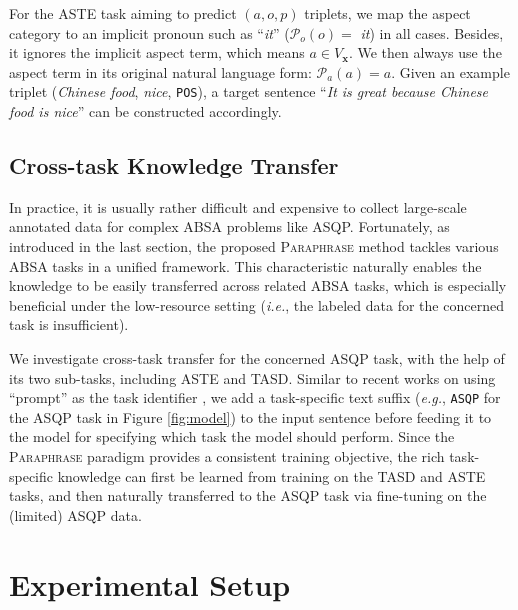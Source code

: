 \documentclass[11pt]{article}
\begin{document}
For the ASTE task aiming to predict $(a, o, p)$ triplets, we map the aspect category to an implicit pronoun such as ``\textit{it}'' ($\mathcal{P}_o(o)=$ \textit{it}) in all cases.
Besides, it ignores the implicit aspect term, which means $a \in V_{\boldsymbol{x}}$. We then always use the aspect term in its original natural language form: $\mathcal{P}_a(a) = a$. 
Given an example triplet (\textit{Chinese food}, \textit{nice}, \texttt{POS}), a target sentence ``\textit{It is great because Chinese food is nice}'' can be constructed accordingly.


\subsection{Cross-task Knowledge Transfer}
In practice, it is usually rather difficult and expensive to collect large-scale annotated data for complex ABSA problems like ASQP. Fortunately, as introduced in the last section, the proposed \textsc{Paraphrase} method tackles various ABSA tasks in a unified framework.
This characteristic naturally enables the knowledge to be easily transferred across related ABSA tasks, which is especially beneficial under the low-resource setting (\textit{i.e.}, the labeled data for the concerned task is insufficient).


We investigate cross-task transfer for the concerned ASQP task, with the help of its two sub-tasks, including ASTE and TASD.
Similar to recent works on using ``prompt'' as the task identifier \cite{t5-paper, gpt-understands}, we add a task-specific text suffix (\textit{e.g.}, \verb|ASQP| for the ASQP task in Figure \ref{fig:model}) to the input sentence before feeding it to the model for specifying which task the model should perform.
Since the \textsc{Paraphrase} paradigm provides a consistent training objective, the rich task-specific knowledge can first be learned from training on the TASD and ASTE tasks, and then naturally transferred to the ASQP task via fine-tuning on the (limited) ASQP data.


\section{Experimental Setup}
\end{document}
